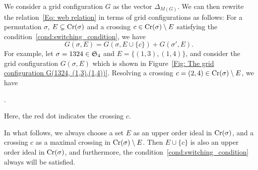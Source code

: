We consider a grid configuration $G$ as the vector $\Delta_{M(G)}$.
We can then rewrite the relation~\eqref{Eq: web relation} in terms of grid
configurations as follows:
For a permutation \( \sigma \), \( E\subsetneq \operatorname{Cr}(\sigma) \)
and a crossing \( c\in\operatorname{Cr}(\sigma)\setminus E \) satisfying the
condition~\eqref{cond:switching_condition}, we have
\[
  G(\sigma,E) = G(\sigma,E\cup\{c\}) + G(\sigma', E).
\]
For example, let \( \sigma=1324\in\mathfrak{S}_4 \) and \( E=\{(1,3),(1,4)\} \), and
consider the grid configuration \( G(\sigma, E) \) which is shown in
Figure~\ref{Fig: The grid configuration G(1324, (1,3),(1,4))}.
Resolving a crossing  \( c=(2,4)\in\operatorname{Cr}(\sigma)\setminus E \),
we have
\begin{center}
  .
\end{center}
Here, the red dot indicates the crossing \( c \).

In what follows, we always choose a set \( E \) as an upper order ideal in
\( \operatorname{Cr}(\sigma) \), and a crossing \( c \) as a maximal crossing in \( \operatorname{Cr}(\sigma)\setminus E \).
Then \( E\cup \{c\} \) is also an upper order ideal in \( \operatorname{Cr}(\sigma) \),
and furthermore, the condition~\eqref{cond:switching_condition} always will be
satisfied.


